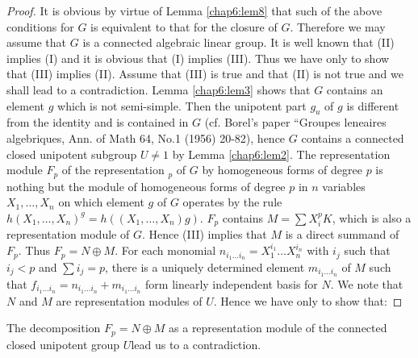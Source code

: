 \begin{proof}
  It is obvious by virtue of Lemma \ref{chap6:lem8} that such of the above
  conditions for $G$ is equivalent to that for the closure of $G$.
  Therefore we may assume that $G$ is a connected algebraic linear group.
  It is well known that (II) implies (I) and it is obvious that (I)
  implies (III).  Thus we have only to show that (III) implies (II).
  Assume that (III) is true and that (II) is not true and we shall
  lead to a contradiction.  Lemma \ref{chap6:lem3} shows that $G$ contains an
  element $g$ which is not semi-simple.  Then the unipotent part $g_u$
  of $g$ is different from the identity and is contained in $G$
  (cf. Borel's paper ``Groupes leneaires algebriques, Ann.  of Math
  64, No.1 (1956) 20-82), hence $G$ contains a connected closed
  unipotent subgroup $U \neq 1$ by Lemma \ref{chap6:lem2}.  The representation
  module $F_p$ of the representation $_p$ of $G$ by homogeneous forms
  of degree $p$ is nothing but the module of homogeneous forms of
  degree $p$ in $n$ variables $X_1,\ldots, X_n$ on which element $g$
  of $G$ operates by the rule $h(X_{1}, \ldots, X_n)^g = h ((X_{1},
  \ldots, X_n)g)$.  $F_p$ contains $M=\sum X^{p}_{i} K$, which is also
  a representation module of $G$.  Hence (III) implies that $M$ is a
  direct summand of $F_p$.  Thus $F_p = N \oplus M$. For each monomial
  $n_{i_1\ldots i_{n}} = X^{i_1}_1 \ldots X^{i_n}_n$ with $i_j$ such
  that $i_j < p$ and $\sum i_j = p$, there is a uniquely determined
  element $m_{i_1\ldots i_n}$ of $M$ such that $f_{i_1\ldots i_n} =
  n_{i_1\ldots i_n} + m_{i_1\ldots i_n}$ form linearly independent
  basis for $N$.  We note that $N$ and $M$ are representation modules
  of $U$.  Hence we have only to show that: 
\end{proof}

The decomposition $F_p= N \oplus M$ as a
representation module of the connected closed unipotent group $U$lead
us to a contradiction. 

